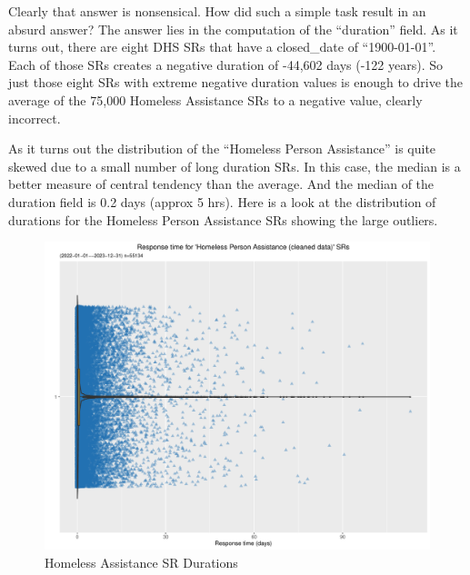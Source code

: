 \documentclass[12pt, titlepage]{article}
\begin{document}
{		Clearly that answer is nonsensical. How did such a simple task result 
		in an absurd answer? The answer lies in the computation of the ``duration'' 
		field. As it turns out, there are eight DHS SRs that have a closed\_date 
		of ``1900-01-01''. Each of those SRs creates a negative duration of -44,602 
		days (-122 years). So just those eight SRs with extreme negative duration 
		values is enough to drive the average of the 75,000 
		Homeless Assistance SRs to a negative value, clearly incorrect.
		
		As it turns out the distribution of the ``Homeless Person Assistance'' is 
		quite skewed due to a small number of long duration SRs. In this case, 
		the median is a better measure of central tendency than the average. 
		And the median of the duration field is  0.2 days (approx 5 hrs). 
		Here is a look at the distribution of durations for the Homeless Person 
		Assistance SRs showing 	the large outliers. 
		
		\begin{figure}[tbp]
		 	 \centering
		 	 \includegraphics[width = \textwidth]{homeless_response_time_clean.pdf}
			 \caption{Homeless Assistance SR Durations}
			 \label{fig:homeless}
		\end{figure}
		
}
\end{document}

